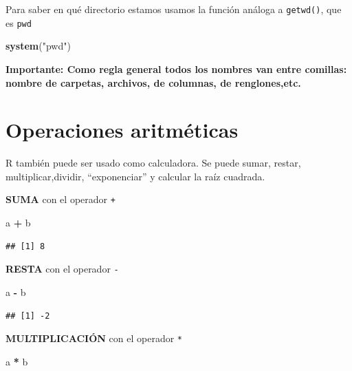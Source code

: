 \documentclass[
]{book}
\newenvironment{Shaded}{\begin{snugshade}}{\end{snugshade}}
\newcommand{\FunctionTok}[1]{\textcolor[rgb]{0.13,0.29,0.53}{\textbf{#1}}}
\newcommand{\NormalTok}[1]{#1}
\newcommand{\SpecialCharTok}[1]{\textcolor[rgb]{0.81,0.36,0.00}{\textbf{#1}}}
\newcommand{\StringTok}[1]{\textcolor[rgb]{0.31,0.60,0.02}{#1}}
\begin{document}
Para saber en qué directorio estamos usamos la función análoga a \texttt{getwd()}, que es \texttt{pwd}

\begin{Shaded}
\begin{Highlighting}[]
\FunctionTok{system}\NormalTok{(}\StringTok{"pwd"}\NormalTok{)}
\end{Highlighting}
\end{Shaded}

\textbf{Importante: Como regla general todos los nombres van entre comillas: nombre de carpetas, archivos, de columnas, de renglones,etc.}

\hypertarget{operaciones-aritmuxe9ticas}{%
\section{Operaciones aritméticas}\label{operaciones-aritmuxe9ticas}}

R también puede ser usado como calculadora.
Se puede sumar, restar, multiplicar,dividir, ``exponenciar'' y calcular la raíz cuadrada.

\textbf{SUMA} con el operador \texttt{+}

\begin{Shaded}
\begin{Highlighting}[]
\NormalTok{a }\SpecialCharTok{+}\NormalTok{ b}
\end{Highlighting}
\end{Shaded}

\begin{verbatim}
## [1] 8
\end{verbatim}

\textbf{RESTA} con el operador \texttt{-}

\begin{Shaded}
\begin{Highlighting}[]
\NormalTok{a }\SpecialCharTok{{-}}\NormalTok{ b}
\end{Highlighting}
\end{Shaded}

\begin{verbatim}
## [1] -2
\end{verbatim}

\textbf{MULTIPLICACIÓN} con el operador \texttt{*}

\begin{Shaded}
\begin{Highlighting}[]
\NormalTok{a }\SpecialCharTok{*}\NormalTok{ b}
\end{Highlighting}
\end{Shaded}
\end{document}
